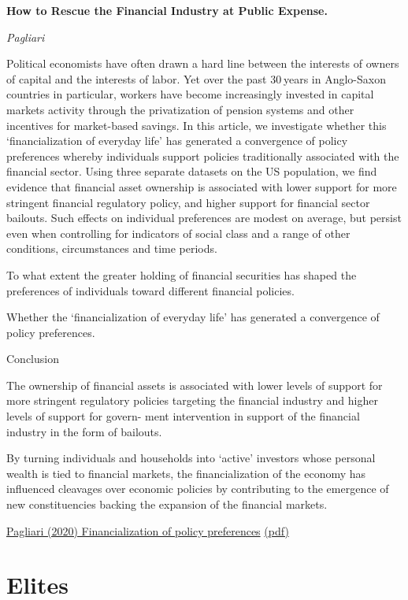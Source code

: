 \documentclass[
]{book}
\begin{document}
\textbf{How to Rescue the Financial Industry at Public Expense.}

\emph{Pagliari}

Political economists have often drawn a hard line between the interests of owners of capital and the interests of labor. Yet over the past 30 years in Anglo-Saxon countries in particular, workers have become increasingly invested in capital markets activity through the privatization of pension systems and other incentives for market-based savings. In this article, we investigate whether this `financialization of everyday life' has generated a convergence of policy preferences whereby individuals support policies traditionally associated with the financial sector. Using three separate datasets on the US population, we find evidence that financial asset ownership is associated with lower support for more stringent financial regulatory policy, and higher support for financial sector bailouts. Such effects on individual preferences are modest on average, but persist even when controlling for indicators of social class and a range of other conditions, circumstances and time periods.

To what extent the greater holding of financial securities has shaped the preferences of
individuals toward different financial policies.

Whether the `financialization of everyday life' has generated a convergence of policy preferences.

Conclusion

The ownership of financial assets is associated with lower levels of support for more stringent
regulatory policies targeting the financial industry and higher levels of support for govern-
ment intervention in support of the financial industry in the form of bailouts.

By turning individuals and households into `active' investors
whose personal wealth is tied to financial markets, the financialization of the economy has
influenced cleavages over economic policies by contributing to the emergence of new
constituencies backing the expansion of the financial markets.

\href{https://academic.oup.com/ser/article/18/3/655/5058009}{Pagliari (2020) Financialization of policy preferences}
\href{pdf/Pagliari_2020_Financialization_of_Policy_Preferences.pdf}{(pdf)}

\hypertarget{elites}{%
\section{Elites}\label{elites}}
\end{document}
